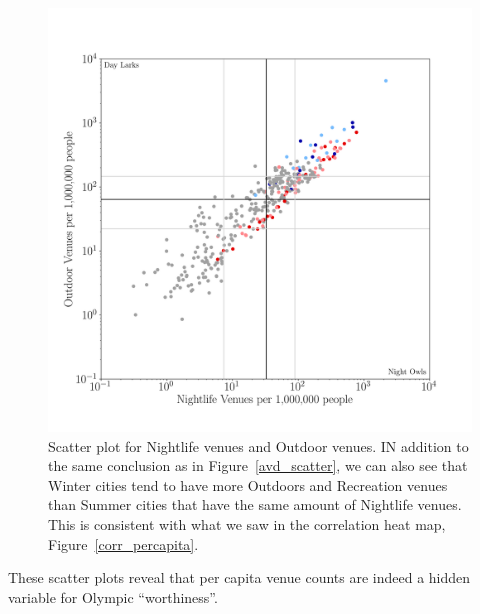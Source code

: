 \documentclass[
 reprint,
 amsmath,amssymb,
 aps,
prb,
floatfix
]{revtex4-2}
\begin{document}
    \begin{figure}[htb]
        \centering
        \includegraphics[width=\columnwidth]{../figures/nightanddaylife_percapita.png}
        \caption{Scatter plot for Nightlife venues and Outdoor venues. IN addition to the same conclusion as in Figure~\ref{avd_scatter}, we can also see that Winter cities tend to have more Outdoors and Recreation venues than Summer cities that have the same amount of Nightlife venues. This is consistent with what we saw in the correlation heat map, Figure~\ref{corr_percapita}.}
        \label{nvd_scatter}
    \end{figure}
    These scatter plots reveal that per capita venue counts are indeed a hidden variable for Olympic ``worthiness''.
\end{document}
